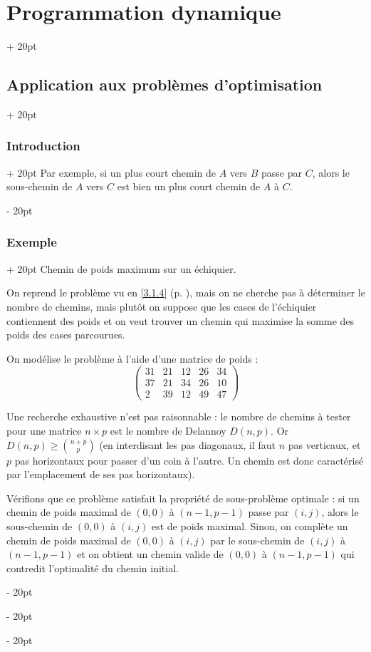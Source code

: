 \documentclass[a4paper, 12pt, twoside]{article}
\renewcommand{\ge}{\geqslant}
\newcommand{\ind}[1][20pt]{\advance\leftskip + #1}
\newcommand{\deind}[1][20pt]{\advance\leftskip - #1}
\newenvironment{indt}[2][20pt]{#2 \par \ind[#1]}{\par \deind} %
\begin{document}
\begin{indt}{\section{Programmation dynamique}}
\begin{indt}{\subsection{Application aux problèmes d'optimisation}}
\begin{indt}{\subsubsection{Introduction}}
                Par exemple, si un plus court chemin de $A$ vers $B$ passe par $C$, alors le sous-chemin de $A$ vers $C$ est bien un plus court chemin de $A$ à $C$.
            \end{indt}
            
            \vspace{12pt}
            
            \begin{indt}{\subsubsection{Exemple}}
                Chemin de poids maximum sur un échiquier.
                
                On reprend le problème vu en \ref{3.1.4} (p. \pageref{3.1.4}), mais on ne cherche pas à déterminer le nombre de chemins, mais plutôt on suppose que les cases de l'échiquier contiennent des poids et on veut trouver un chemin qui maximise la somme des poids des cases parcourues.
                
                On modélise le problème à l'aide d'une matrice de poids :
                    \[
                        \begin{pmatrix}
                            31 & 21 & 12 & 26 & 34
                            \\
                            37 & 21 & 34 & 26 & 10
                            \\
                            2 & 39 & 12 & 49 & 47
                        \end{pmatrix}
                    \]
                
                Une recherche exhaustive n'est pas raisonnable : le nombre de chemins à tester pour une matrice $n \times p$ est le nombre de Delannoy $D(n, p)$. Or $\displaystyle D(n, p) \ge \binom{n + p}{p}$ (en interdisant les pas diagonaux, il faut $n$ pas verticaux, et $p$ pas horizontaux pour passer d'un coin à l'autre. Un chemin est donc caractérisé par l'emplacement de ses pas horizontaux).
                
                \vspace{12pt}
                
                Vérifions que ce problème satisfait la propriété de sous-problème optimale : si un chemin de poids maximal de $(0, 0)$ à $(n - 1, p - 1)$ passe par $(i, j)$, alors le sous-chemin de $(0, 0)$ à $(i, j)$ est de poids maximal. Sinon, on complète un chemin de poids maximal de $(0, 0)$ à $(i, j)$ par le sous-chemin de $(i, j)$ à $(n - 1, p - 1)$ et on obtient un chemin valide de $(0, 0)$ à $(n - 1, p - 1)$ qui contredit l'optimalité du chemin initial.
                

\end{indt}
\end{indt}
\end{indt}
\end{document}
